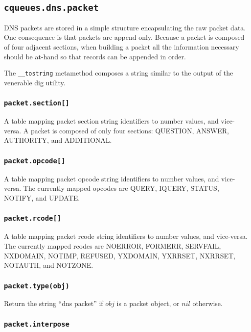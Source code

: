 \documentclass[11pt, oneside]{memoir}
\newcommand{\routine}[1]{\texttt{#1} }
\newcommand{\fn}[1]{\texttt{#1} }
\newcounter{toccols}
\newenvironment{Module}[1]{
	\subsection{\texttt{#1}}
	\addtocontents{toc}{
		\protect\begin{multicols}{\value{toccols}}
	}
}{
	\addtocontents{toc}{\protect\end{multicols}}
}
\begin{document}
\begin{Module}{cqueues.dns.packet}

DNS packets are stored in a simple structure encapsulating the raw packet data. One consequence is that packets are append only. Because a packet is composed of four adjacent sections, when building a packet all the information necessary should be at-hand so that records can be appended in order.

The \fn{\_\_tostring} metamethod composes a string similar to the output of the venerable dig utility.

\subsubsection[\fn{packet.section[]}]{\fn{packet.section[]}}

A table mapping packet section string identifiers to number values, and vice-versa. A packet is composed of only four sections: QUESTION, ANSWER, AUTHORITY, and ADDITIONAL.

\subsubsection[\fn{packet.opcode[]}]{\fn{packet.opcode[]}}

A table mapping packet opcode string identifiers to number values, and vice-versa. The currently mapped opcodes are QUERY, IQUERY, STATUS, NOTIFY, and UPDATE.

\subsubsection[\fn{packet.rcode[]}]{\fn{packet.rcode[]}}

A table mapping packet rcode string identifiers to number values, and vice-versa. The currently mapped rcodes are NOERROR, FORMERR, SERVFAIL, NXDOMAIN, NOTIMP, REFUSED, YXDOMAIN, YXRRSET, NXRRSET, NOTAUTH, and NOTZONE.

\subsubsection[\routine{packet.type}]{\routine{packet.type(obj)}}
Return the string ``dns packet'' if $obj$ is a packet object, or $nil$ otherwise.

\subsubsection[\fn{packet.interpose}]{\fn{packet.interpose}}


\end{Module}
\end{document}
